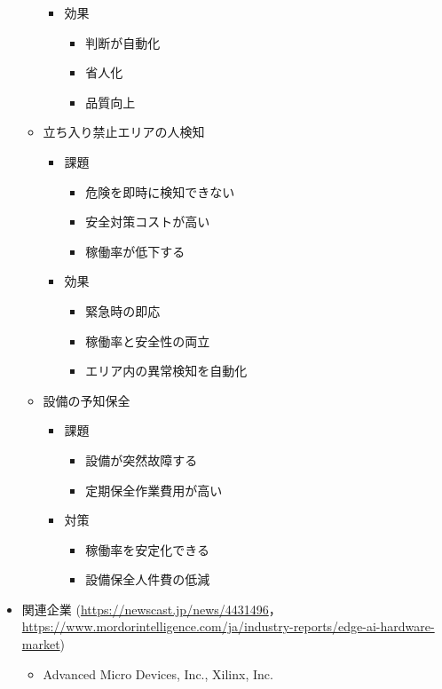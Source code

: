 \begin{itemize}
\begin{itemize}
\begin{itemize}
			\item 効果
			\begin{itemize}
				\item 判断が自動化
				\item 省人化
				\item 品質向上
			\end{itemize}
		\end{itemize}
		\item 立ち入り禁止エリアの人検知
		\begin{itemize}
			\item 課題
			\begin{itemize}
				\item 危険を即時に検知できない
				\item 安全対策コストが高い
				\item 稼働率が低下する
			\end{itemize}
			\item 効果
			\begin{itemize}
				\item 緊急時の即応
				\item 稼働率と安全性の両立
				\item エリア内の異常検知を自動化
			\end{itemize}
		\end{itemize}
		\item 設備の予知保全
		\begin{itemize}
			\item 課題
			\begin{itemize}
				\item 設備が突然故障する
				\item 定期保全作業費用が高い
			\end{itemize}
			\item 対策
			\begin{itemize}
				\item 稼働率を安定化できる
				\item 設備保全人件費の低減
			\end{itemize}
		\end{itemize}
	\end{itemize}
	\item 関連企業 (\url{https://newscast.jp/news/4431496}，\url{https://www.mordorintelligence.com/ja/industry-reports/edge-ai-hardware-market})
	\begin{itemize}
		\item Advanced Micro Devices, Inc., Xilinx, Inc.
		\begin{itemize}

\end{itemize}
\end{itemize}
\end{itemize}
